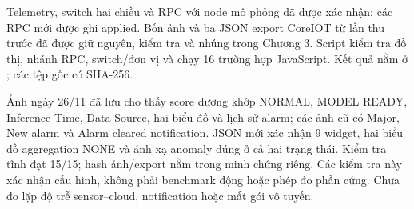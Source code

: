 Telemetry, switch hai chiều và RPC với node mô phỏng đã được xác nhận; các RPC mới được ghi applied. Bốn ảnh và ba JSON export CoreIOT từ lần thu trước đã được giữ nguyên, kiểm tra và nhúng trong Chương 3. Script  kiểm tra đồ thị, nhánh RPC, switch/đơn vị và chạy 16 trường hợp JavaScript. Kết quả nằm ở ; các tệp gốc có SHA-256.

Ảnh ngày 26/11 đã lưu cho thấy score dương khớp NORMAL, MODEL READY, Inference Time, Data Source, hai biểu đồ và lịch sử alarm; các ảnh cũ có Major, New alarm và Alarm cleared notification. JSON mới xác nhận 9 widget, hai biểu đồ aggregation NONE và ánh xạ anomaly đúng ở cả hai trạng thái. Kiểm tra tĩnh đạt 15/15; hash ảnh/export nằm trong minh chứng riêng. Các kiểm tra này xác nhận cấu hình, không phải benchmark động hoặc phép đo phần cứng. Chưa đo lặp độ trễ sensor--cloud, notification hoặc mất gói vô tuyến.
